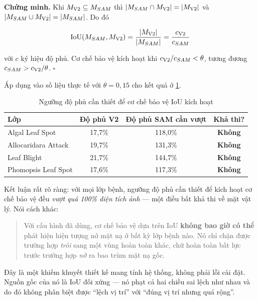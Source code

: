 \textbf{Chứng minh.} Khi $M_{\text{V2}} \subseteq M_{SAM}$ thì
$|M_{SAM} \cap M_{\text{V2}}| = |M_{\text{V2}}|$ và
$|M_{SAM} \cup M_{\text{V2}}| = |M_{SAM}|$. Do đó

\begin{equation}
    \operatorname{IoU}(M_{SAM}, M_{\text{V2}})
    = \frac{|M_{\text{V2}}|}{|M_{SAM}|}
    = \frac{c_{\text{V2}}}{c_{SAM}}
    \label{eq:iou_containment}
\end{equation}

với $c$ ký hiệu độ phủ. Cơ chế bảo vệ kích hoạt khi
$c_{\text{V2}}/c_{SAM} < \theta$, tương đương $c_{SAM} > c_{\text{V2}}/\theta$.
$\square$

Áp dụng vào số liệu thực tế với $\theta = 0{,}15$ cho kết quả ở
\cref{tab:iouguard_analysis}.

\begin{table}[H]
\centering
\caption{Ngưỡng độ phủ cần thiết để cơ chế bảo vệ IoU kích hoạt}
\label{tab:iouguard_analysis}
\begin{tabular}{l c c c}
\toprule
\textbf{Lớp} & \textbf{Độ phủ V2} & \textbf{Độ phủ SAM cần vượt} & \textbf{Khả thi?} \\
\midrule
Algal Leaf Spot     & 17,7\% & 118,0\% & \textbf{Không} \\
Allocaridara Attack & 19,7\% & 131,3\% & \textbf{Không} \\
Leaf Blight         & 21,7\% & 144,7\% & \textbf{Không} \\
Phomopsis Leaf Spot & 17,6\% & 117,3\% & \textbf{Không} \\
\bottomrule
\end{tabular}
\end{table}

Kết luận rất rõ ràng: với mọi lớp bệnh, ngưỡng độ phủ cần thiết để kích hoạt cơ chế
bảo vệ đều \emph{vượt quá 100\% diện tích ảnh} --- một điều bất khả thi về mặt vật
lý. Nói cách khác:

\begin{quote}
Với cấu hình đã dùng, cơ chế bảo vệ dựa trên IoU \textbf{không bao giờ có thể}
phát hiện hiện tượng nở mặt nạ ở bất kỳ lớp bệnh nào. Nó chỉ chặn được trường hợp
\SAM{} \emph{trôi} sang một vùng hoàn toàn khác, chứ hoàn toàn bất lực trước trường
hợp \SAM{} \emph{nở} ra bao trùm mặt nạ gốc.
\end{quote}

Đây là một khiếm khuyết thiết kế mang tính hệ thống, không phải lỗi cài đặt. Nguồn
gốc của nó là IoU đối xứng --- nó phạt cả hai chiều sai lệch như nhau và do đó
không phân biệt được ``lệch vị trí'' với ``đúng vị trí nhưng quá rộng''.

